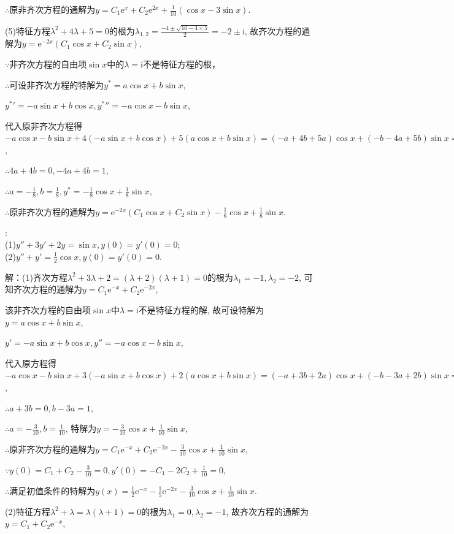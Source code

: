 \documentclass[12pt,UTF8,fleqn]{ctexart}
\newcommand{\me}[0]{\mathrm e}
\newcommand{\m}[0]{\mathrm }
\begin{document}
\begin{enumerate}
$\therefore$原非齐次方程的通解为$y=C_1\me^x+C_2\me^{2x}+\frac1{10}(\cos x-3\sin x)$.

(5)特征方程$\lambda^2+4\lambda+5=0$的根为$\lambda_{1,2}=\frac{-4\pm\sqrt{16-4\times5}}2=-2\pm\m i$, 故齐次方程的通解为$y=\me^{-2x}(C_1\cos x+C_2\sin x)$,

$\because$非齐次方程的自由项$\sin x$中的$\lambda=\m i$不是特征方程的根，

$\therefore$可设非齐次方程的特解为$y^*=a\cos x+b\sin x$,

${y^*}'=-a\sin x+b\cos x,{y^*}''=-a\cos x-b\sin x$,

代入原非齐次方程得$-a\cos x-b\sin x+4(-a\sin x+b\cos x)+5(a\cos x+b\sin x)=(-a+4b+5a)\cos x+(-b-4a+5b)\sin x=(4a+4b)\cos x+(-4a+4b)\sin x=\sin x$,

$\therefore 4a+4b=0,-4a+4b=1$,

$\therefore a=-\frac18,b=\frac18,y^*=-\frac18\cos x+\frac18\sin x$,

$\therefore$原非齐次方程的通解为$y=\me^{-2x}(C_1\cos x+C_2\sin x)-\frac18\cos x+\frac18\sin x$.

:\\
(1)$y''+3y'+2y=\sin x,y(0)=y'(0)=0$;\\
(2)$y''+y'=\frac12\cos x,y(0)=y'(0)=0$.

解：(1)齐次方程$\lambda^2+3\lambda+2=(\lambda+2)(\lambda+1)=0$的根为$\lambda_1=-1,\lambda_2=-2$, 可知齐次方程的通解为$y=C_1\me^{-x}+C_2\me^{-2x}$,

该非齐次方程的自由项$\sin x$中$\lambda=\m i$不是特征方程的解, 故可设特解为$y=a\cos x+b\sin x$,

$y'=-a\sin x+b\cos x,y''=-a\cos x-b\sin x$,

代入原方程得$-a\cos x-b\sin x+3(-a\sin x+b\cos x)+2(a\cos x+b\sin x)=(-a+3b+2a)\cos x+(-b-3a+2b)\sin x=(a+3b)\cos x+(b-3a)\sin x=\sin x$,

$\therefore a+3b=0,b-3a=1$,

$\therefore a=-\frac3{10},b=\frac1{10}$, 特解为$y=-\frac3{10}\cos x+\frac1{10}\sin x$,

$\therefore$原非齐次方程的通解为$y=C_1\me^{-x}+C_2\me^{-2x}-\frac3{10}\cos x+\frac1{10}\sin x$,

$\because y(0)=C_1+C_2-\frac3{10}=0,y'(0)=-C_1-2C_2+\frac1{10}=0$,

$\therefore$满足初值条件的特解为$y(x)=\frac12\me^{-x}-\frac15\me^{-2x}-\frac3{10}\cos x+\frac1{10}\sin x$.

(2)特征方程$\lambda^2+\lambda=\lambda(\lambda+1)=0$的根为$\lambda_1=0,\lambda_2=-1$, 故齐次方程的通解为$y=C_1+C_2\me^{-x}$,


\end{enumerate}
\end{document}
